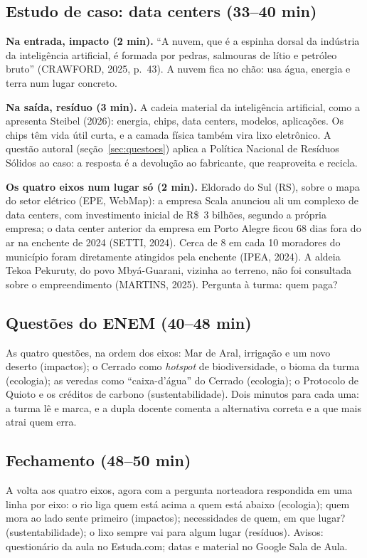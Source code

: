 \documentclass[11pt]{article}
\begin{document}
\subsection{Estudo de caso: data centers (33--40 min)}
\textbf{Na entrada, impacto (2 min).} \enquote{A nuvem, que é a espinha dorsal da indústria da inteligência
artificial, é formada por pedras, salmouras de lítio e petróleo bruto} (CRAWFORD, 2025, p.~43). A nuvem fica no
chão: usa água, energia e terra num lugar concreto.

\textbf{Na saída, resíduo (3 min).} A cadeia material da inteligência artificial, como a apresenta Steibel (2026):
energia, chips, data centers, modelos, aplicações. Os chips têm vida útil curta, e a camada física também vira
lixo eletrônico. A questão autoral (seção~\ref{sec:questoes}) aplica a Política Nacional de Resíduos Sólidos ao
caso: a resposta é a devolução ao fabricante, que reaproveita e recicla.

\textbf{Os quatro eixos num lugar só (2 min).} Eldorado do Sul (RS), sobre o mapa do setor elétrico (EPE, WebMap):
a empresa Scala anunciou ali um complexo de data centers, com investimento inicial de R\$~3 bilhões, segundo a
própria empresa; o data center anterior da empresa em Porto Alegre ficou 68 dias fora do ar na enchente de 2024
(SETTI, 2024). Cerca de 8 em cada 10 moradores do município foram diretamente atingidos pela enchente (IPEA, 2024).
A aldeia Tekoa Pekuruty, do povo Mbyá-Guarani, vizinha ao terreno, não foi consultada sobre o empreendimento
(MARTINS, 2025). Pergunta à turma: quem paga?

\subsection{Questões do ENEM (40--48 min)}
As quatro questões, na ordem dos eixos: Mar de Aral, irrigação e um novo deserto (impactos); o Cerrado como
\emph{hotspot} de biodiversidade, o bioma da turma (ecologia); as veredas como \enquote{caixa-d'água} do Cerrado
(ecologia); o Protocolo de Quioto e os créditos de carbono (sustentabilidade). Dois minutos para cada uma: a turma
lê e marca, e a dupla docente comenta a alternativa correta e a que mais atrai quem erra.

\subsection{Fechamento (48--50 min)}
A volta aos quatro eixos, agora com a pergunta norteadora respondida em uma linha por eixo: o rio liga quem está
acima a quem está abaixo (ecologia); quem mora ao lado sente primeiro (impactos); necessidades de quem, em que lugar?
(sustentabilidade); o lixo sempre vai para algum lugar (resíduos). Avisos: questionário da aula no Estuda.com;
datas e material no Google Sala de Aula.
\end{document}
